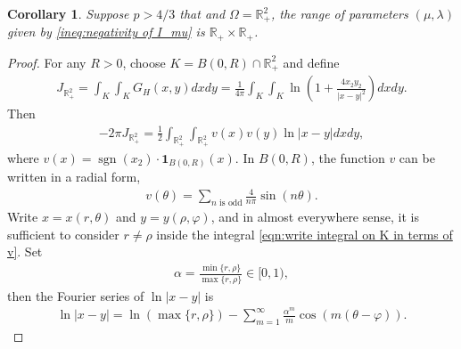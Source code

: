 \documentclass[11pt,letterpaper]{amsart}
\newtheorem{cor}[thm]{Corollary}
\theoremstyle{definition}
\theoremstyle{remark}
\newcommand{\R}{\mathbb{R}}
\renewcommand{\O}{\Omega}
\newcommand{\sgn}{\operatorname{sgn}}
\renewcommand{\tt}[1]{\text{#1}}
\numberwithin{equation}{section}
\begin{document}
\begin{cor}\label{cor:range of mu and lambda Omega=R^_+}
    Suppose $p>4/3$ that and $\O=\R^2_+$, the range of parameters $(\mu,\lambda)$ given by \eqref{ineq:negativity of I_mu} is $\R_+ \times \R_+$.
\end{cor}
\begin{proof}
    For any $R>0$, choose $K=B(0,R)\cap \R^2_+$ and define 
\begin{align*}
    J_{\R^2_+}=\int_{K}\int_{K}G_H(x,y)dxdy=\frac{1}{4\pi}\int_{K}\int_{K}\ln(1+\frac{4x_2 y_2}{|x-y|^2})dxdy.
\end{align*}
Then 
\begin{align}
    -2\pi J_{\R^2_+} = \frac{1}{2}\int_{\R^2_+}\int_{\R^2_+} v(x)v(y)\ln|x-y|dxdy, \label{eqn:write integral on K in terms of v}
\end{align}
where $v(x)=\sgn(x_2)\cdot \mathbf{1}_{B(0,R)}(x)$. In $B(0,R)$, the function $v$ can be written in a radial form,
\begin{align}
    v(\theta)=\sum_{n \tt{ is odd}}\frac{4}{n\pi}\sin(n\theta). \label{eqn:radial form of v}
\end{align}
Write $x=x(r,\theta)$ and $y=y(\rho,\varphi)$, and in almost everywhere sense, it is sufficient to consider $r\neq \rho$ inside the integral \eqref{eqn:write integral on K in terms of v}. Set 
\begin{align*}
    \alpha=\frac{\min\{r,\rho\}}{\max\{r,\rho\}}\in[0,1),
\end{align*}
then the Fourier series of $\ln|x-y|$ is
\begin{align*}
    \ln|x-y|=\ln(\max\{r,\rho\})-\sum_{m=1}^\infty \frac{\alpha^m}{m}\cos(m(\theta-\varphi)).
\end{align*}


\end{proof}
\end{document}

